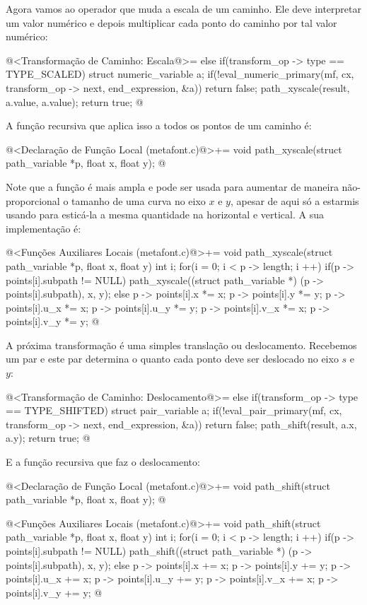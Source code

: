 {Agora vamos ao operador que muda a escala de um caminho. Ele deve
interpretar um valor numérico e depois multiplicar cada ponto do
caminho por tal valor numérico:

@<Transformação de Caminho: Escala@>=
else if(transform_op -> type == TYPE_SCALED){
  struct numeric_variable a;
  if(!eval_numeric_primary(mf, cx, transform_op -> next, end_expression,
                          &a))
    return false;
  path_xyscale(result, a.value, a.value);  
  return true;
}
@
\fimcodigo

A função recursiva que aplica isso a todos os pontos de um caminho é:

\iniciocodigo
@<Declaração de Função Local (metafont.c)@>+=
void path_xyscale(struct path_variable *p, float x, float y);
@
\fimcodigo

Note que a função é mais ampla e pode ser usada para aumentar de
maneira não-proporcional o tamanho de uma curva no eixo $x$ e $y$,
apesar de aqui só a estarmis usando para esticá-la a mesma quantidade
na horizontal e vertical. A sua implementação é:

\iniciocodigo
@<Funções Auxiliares Locais (metafont.c)@>+=
void path_xyscale(struct path_variable *p, float x, float y){
  int i;
  for(i = 0; i < p -> length; i ++){
    if(p -> points[i].subpath != NULL)
      path_xyscale((struct path_variable *) (p -> points[i].subpath), x,
                   y);
    else{
      p -> points[i].x *= x;
      p -> points[i].y *= y;
      p -> points[i].u_x *= x;
      p -> points[i].u_y *= y;
      p -> points[i].v_x *= x;
      p -> points[i].v_y *= y;
    }
  }
}
@
\fimcodigo

A próxima transformação é uma simples translação ou
deslocamento. Recebemos um par e este par determina o quanto cada
ponto deve ser deslocado no eixo $s$ e $y$:

\iniciocodigo
@<Transformação de Caminho: Deslocamento@>=
else if(transform_op -> type == TYPE_SHIFTED){
  struct pair_variable a;
  if(!eval_pair_primary(mf, cx, transform_op -> next, end_expression,
                          &a))
    return false;
  path_shift(result, a.x, a.y);  
  return true;
}
@
\fimcodigo

E a função recursiva que faz o deslocamento:

\iniciocodigo
@<Declaração de Função Local (metafont.c)@>+=
void path_shift(struct path_variable *p, float x, float y);
@
\fimcodigo

\iniciocodigo
@<Funções Auxiliares Locais (metafont.c)@>+=
void path_shift(struct path_variable *p, float x, float y){
  int i;
  for(i = 0; i < p -> length; i ++){
    if(p -> points[i].subpath != NULL)
      path_shift((struct path_variable *) (p -> points[i].subpath), x, y);
    else{
      p -> points[i].x += x;
      p -> points[i].y += y;
      p -> points[i].u_x += x;
      p -> points[i].u_y += y;
      p -> points[i].v_x += x;
      p -> points[i].v_y += y;
    }
  }
}
@
\fimcodigo

}
